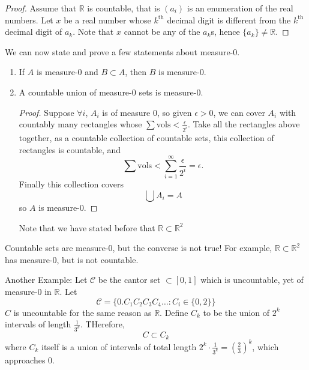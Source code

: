 \documentclass{article}
\numberwithin{equation}{section}
\begin{document}
\begin{proof}
    Assume that $\mathbb{R}$ is countable, that is $(a_i)$ is an enumeration of the real numbers. Let $x$ be a real number whose $k^\text{th}$ decimal digit is different from the $k^\text{th}$ decimal digit of $a_k$. Note that $x$ cannot be any of the $a_k$s, hence $\{a_k\}\neq \mathbb{R}$.
\end{proof}
We can now state and prove a few statements about measure-$0$.
\begin{enumerate}
    \item If $A$ is measure-$0$ and $B\subset A$, then $B$ is measure-$0$.
    \item A countable union of measure-$0$ sets is measure-$0$.
          \begin{proof}
              Suppose $\forall i$, $A_i$ is of measure $0$, so given $\epsilon > 0$, we can cover $A_i$ with countably many rectangles whose $\sum\text{vols} < \frac{\epsilon}{2^i}$. Take all the rectangles above together, as a countable collection of countable sets, this collection of rectangles is countable, and
              \begin{equation}
                  \sum\text{vols} < \sum_{i=1}^\infty \frac{\epsilon}{2^i} = \epsilon.
              \end{equation}
              Finally this collection covers
              \begin{equation}
                  \bigcup A_i = A
              \end{equation}
              so $A$ is measure-$0$.
          \end{proof}
          Note that we have stated before that $\mathbb{R} \subset \mathbb{R}^2$
\end{enumerate}
\begin{warning}
    Countable sets are measure-$0$, but the converse is not true! For example, $\mathbb{R}\subset\mathbb{R}^2$ has measure-$0$, but is not countable.
\end{warning}
Another Example: Let $\mathcal{C}$ be the cantor set $\subset [0,1]$ which is uncountable, yet of measure-$0$ in $\mathbb{R}$. Let
\begin{equation}
    \mathcal{C} = \{0.C_1C_2C_3C_4\dots: C_i \in \{0,2\}\}
\end{equation}
$C$ is uncountable for the same reason as $\mathbb{R}$. Define $C_k$ to be the union of $2^k$ intervals of length $\frac{1}{3^k}$. THerefore,
\begin{equation}
    C \subset C_k
\end{equation}
where $C_k$ itself is a union of intervals of total length $2^k \cdot \frac{1}{3^k} = \left(\frac{2}{3}\right)^k$, which approaches $0$.
\end{document}

